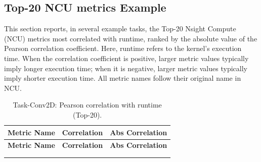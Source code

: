 \subsection{Top-20 NCU metrics Example}\label{app:top-20}

 This section reports, in several example tasks, the Top-20 Nsight Compute (NCU) metrics most correlated with runtime, ranked by the absolute value of the Pearson correlation coefficient. Here, runtime refers to the kernel’s execution time. When the correlation coefficient is positive, larger metric values typically imply longer execution time; when it is negative, larger metric values typically imply shorter execution time. All metric names follow their original name in NCU.



\scriptsize
\begin{longtable}{>{\raggedright\arraybackslash}p{}
                  S[table-format=+1.6]
                  S[table-format=1.6]}
\caption{Task-Conv2D: Pearson correlation with runtime (Top-20).}
\label{tab:app-conv2d-top20}\\
\toprule
\textbf{Metric Name} & {\textbf{Correlation}} & {\textbf{Abs Correlation}} \\
\midrule
\endfirsthead
\toprule
\textbf{Metric Name} & {\textbf{Correlation}} & {\textbf{Abs Correlation}} \\
\midrule
\endhead
\midrule
{} \\
\endfoot
\bottomrule
\endlastfoot


\end{longtable}
